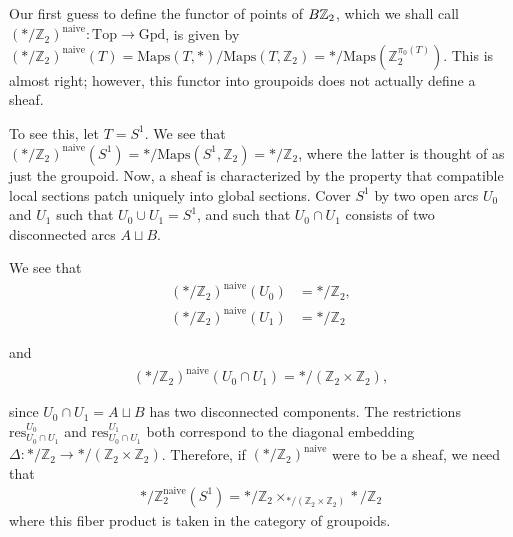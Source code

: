 \documentclass[12pt]{article}
\begin{document}
Our first guess to define the functor of points of $B\mathbb{Z}_2$, which we shall call $(*/\mathbb{Z}_2)^{\text{naive}} : \text{Top} \to \text{Gpd}$, is given by
$(*/\mathbb{Z}_2)^{\text{naive}}(T) = \text{Maps}(T, *)/\text{Maps}(T, \mathbb{Z}_2) = */\text{Maps}(\mathbb{Z}_2^{\pi_0(T)})$. This is almost right; however, this functor into groupoids does not actually define a sheaf.

To see this, let $T = S^1$. We see that $(*/\mathbb{Z}_2)^{\text{naive}}(S^1) = */\text{Maps}(S^1, \mathbb{Z}_2) = */\mathbb{Z}_2$, where the latter is thought of as just the groupoid. Now, a sheaf is characterized by the property that compatible local sections patch uniquely into global sections. Cover $S^1$ by two open arcs $U_0$ and $U_1$
such that $U_0 \cup U_1 = S^1$, and such that $U_0 \cap U_1$ consists of two disconnected arcs $A \sqcup B$.

We see that
\begin{align}
    (*/\mathbb{Z}_2)^{\text{naive}}(U_0) & = */\mathbb{Z}_2, \\
    (*/\mathbb{Z}_2)^{\text{naive}}(U_1) & = */\mathbb{Z}_2
\end{align}

and
\begin{align}
    (*/\mathbb{Z}_2)^{\text{naive}}(U_0 \cap U_1) = */(\mathbb{Z}_2 \times \mathbb{Z}_2),
\end{align}

since $U_0 \cap U_1 = A \sqcup B$ has two disconnected components. The restrictions $\text{res}_{U_0 \cap U_1}^{U_0}$ and
$\text{res}_{U_0 \cap U_1}^{U_1}$ both correspond to the diagonal embedding $\Delta : */\mathbb{Z}_2 \to */(\mathbb{Z}_2 \times \mathbb{Z}_2)$. Therefore, if $(*/\mathbb{Z}_2)^{\text{naive}}$ were to be a sheaf, we need that \begin{align*}
    */\mathbb{Z}_2^{\text{naive}}(S^1) = */\mathbb{Z}_2 \times_{*/(\mathbb{Z}_2 \times \mathbb{Z}_2)} */\mathbb{Z}_2
\end{align*} where this fiber product is taken in the category of groupoids.
\end{document}
